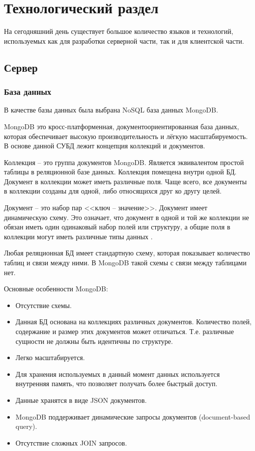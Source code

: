 \chapter{Технологический раздел}
На сегодняшний день существует большое количество языков и технологий, используемых как для разработки серверной части, так и для клиентской части.
\section{Сервер}

\subsection{База данных}
В качестве базы данных была выбрана NoSQL база данных MongoDB.

MongoDB это кросс-платформенная, документоориентированная база данных, которая обеспечивает высокую производительность и лёгкую масштабируемость. В основе данной СУБД лежит концепция коллекций и документов.

Коллекция – это группа документов MongoDB. Является эквивалентом простой таблицы в реляционной базе данных. Коллекция помещена внутри одной БД. Документ в коллекции может иметь различные поля. Чаще всего, все документы в коллекции созданы для одной, либо относящихся друг ко другу целей.

Документ – это набор пар <<ключ – значение>>. Документ имеет динамическую схему. Это означает, что документ в одной и той же коллекции не обязан иметь один одинаковый набор полей или структуру, а общие поля в коллекции могут иметь различные типы данных \cite{mdb}.

Любая реляционная БД имеет стандартную схему, которая показывает количество таблиц и связи между ними. В MongoDB такой схемы с связи между таблицами нет.

Основные особенности MongoDB:

\begin{itemize}
	\item Отсутствие схемы.
	\item Данная БД основана на коллекциях различных документов. Количество полей, содержание и размер этих документов может отличаться. Т.е. различные сущности не должны быть идентичны по структуре.
	\item Легко масштабируется.
	\item Для хранения используемых в данный момент данных используется внутренняя память, что позволяет получать более быстрый доступ.
	\item Данные хранятся в виде JSON документов.
	\item MongoDB поддерживает динамические запросы документов (document-based query).
	\item Отсутствие сложных JOIN запросов.
\end{itemize}

